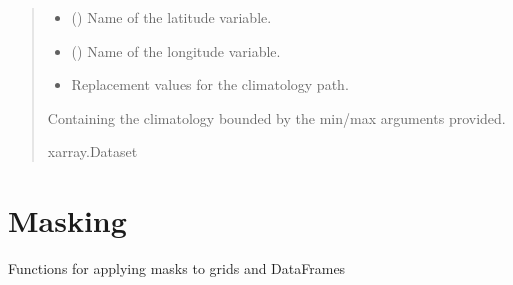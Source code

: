\documentclass[letterpaper,10pt,english]{sphinxmanual}
\begin{document}
\begin{fulllineitems}
\begin{quote}
\begin{description}
\begin{itemize}
\item {}
\sphinxAtStartPar
{} () \textendash{} Name of the latitude variable.

\item {}
\sphinxAtStartPar
{} () \textendash{} Name of the longitude variable.

\item {}
\sphinxAtStartPar
{} \textendash{} Replacement values for the climatology path.

\end{itemize}

\sphinxAtStartPar
{} \textendash{} Containing the climatology bounded by the min/max arguments provided.

\sphinxAtStartPar
xarray.Dataset

\end{description}\end{quote}

\end{fulllineitems}



\section{Masking}
\label{\detokenize{misc:module-glomar_gridding.mask}}\label{\detokenize{misc:masking}}
\sphinxAtStartPar
Functions for applying masks to grids and DataFrames
\end{document}

